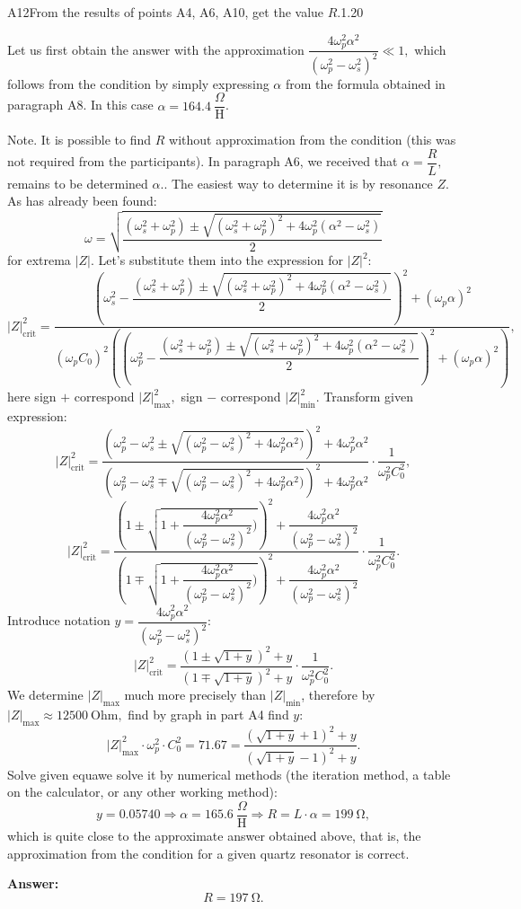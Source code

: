 \documentclass[11pt,a4paper]{article}
\begin{document}
\begin{solcard}{A12}{From the results of points A4, A6, A10, get the value $R$.}{1.20}

Let us first obtain the answer with the approximation $\dfrac{4 \omega_p^2 \alpha^2}{(\omega_p^2-\omega_s^2)^2} \ll 1,$ which follows from the condition by simply expressing $\alpha$ from the formula obtained in paragraph A8. In this case $\alpha = 164.4~\dfrac{\Omega}{\text{H}}$.


Note. It is possible to find $R$ without approximation from the condition (this was not required from the participants). In paragraph A6, we received that $\alpha = \dfrac{R}{L},$ remains to be determined $\alpha.$. The easiest way to determine it is by resonance $Z.$ As has already been found: \[\omega = \sqrt{\dfrac{(\omega_s^2+\omega_p^2)\pm \sqrt{(\omega_s^2+\omega_p^2)^2+4\omega_p^2 (\alpha^2 - \omega_s^2)} }{2}}\] for extrema $|Z|$. Let's substitute them into the expression for $|Z|^2:$ $$|Z|_\text{crit}^2 = \dfrac{\left(\omega_s^2 - \dfrac{(\omega_s^2+\omega_p^2)\pm \sqrt{(\omega_s^2+\omega_p^2)^2+4\omega_p^2 (\alpha^2 - \omega_s^2)} }{2}\right)^2 + \left(\omega_p \alpha \right)^2}{(\omega_p C_0)^2 \left( \left(\omega_p^2 - \dfrac{(\omega_s^2+\omega_p^2)\pm \sqrt{(\omega_s^2+\omega_p^2)^2+4\omega_p^2 (\alpha^2 - \omega_s^2)} }{2} \right)^2 + \left(\omega_p \alpha \right)^2 \right)},$$ here sign $+$ correspond $|Z|_\text{max}^2,$ sign $-$ correspond $|Z|_\text{min}^2.$ Transform given expression: $$|Z|_\text{crit}^2 = \dfrac{ \left( \omega_p^2-\omega_s^2 \pm \sqrt{(\omega_p^2-\omega_s^2)^2+4 \omega_p^2 \alpha^2)}\right)^2+4 \omega_p^2 \alpha^2}{\left( \omega_p^2-\omega_s^2 \mp \sqrt{(\omega_p^2-\omega_s^2)^2+4 \omega_p^2 \alpha^2)}\right)^2+4 \omega_p^2 \alpha^2} \cdot \dfrac{1}{\omega_p^2 C_0^2},$$ $$|Z|_\text{crit}^2 = \dfrac{ \left( 1 \pm \sqrt{1+\dfrac{4 \omega_p^2 \alpha^2}{(\omega_p^2-\omega_s^2)^2})}\right)^2+\dfrac{4 \omega_p^2 \alpha^2}{(\omega_p^2-\omega_s^2)^2}}{\left( 1 \mp \sqrt{1+\dfrac{4 \omega_p^2 \alpha^2}{(\omega_p^2-\omega_s^2)^2})}\right)^2+\dfrac{4 \omega_p^2 \alpha^2}{(\omega_p^2-\omega_s^2)^2}} \cdot \dfrac{1}{\omega_p^2 C_0^2}.$$ Introduce notation $y = \dfrac{4 \omega_p^2 \alpha^2}{(\omega_p^2-\omega_s^2)^2}:$ $$|Z|_\text{crit}^2 = \dfrac{ \left( 1 \pm \sqrt{1+y}\right)^2+y}{\left( 1 \mp \sqrt{1+y}\right)^2+y} \cdot \dfrac{1}{\omega_p^2 C_0^2}.$$ We determine $|Z|_{\max}$ much more precisely than $|Z|_{\min}$, therefore by $|Z|_\text{max} \approx 12500~\text{Ohm},$ find by graph in part A4 find $y$: $$|Z|_\text{max}^2 \cdot \omega_p^2 \cdot C_0^2 = 71.67 = \dfrac{ \left( \sqrt{1+y}+1\right)^2+y}{\left( \sqrt{1+y}-1\right)^2+y}.$$ Solve given equawe solve it by numerical methods (the iteration method, a table on the calculator, or any other working method): $$y = 0.05740 \Rightarrow \alpha = 165.6~\dfrac{\Omega}{\text{H}} \Rightarrow R  = L \cdot \alpha = 199~\mathrm{\Omega},$$ which is quite close to the approximate answer obtained above, that is, the approximation from the condition for a given quartz resonator is correct.

\par\smallskip\noindent\textbf{Answer:} \[R = 197~\mathrm{\Omega}.\]
\end{solcard}
\end{document}
